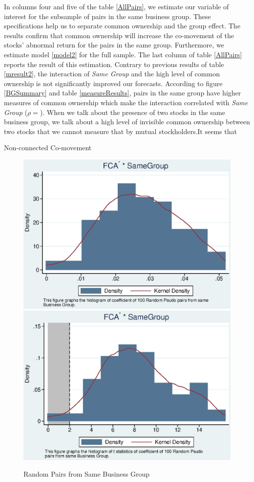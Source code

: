 \documentclass[12pt, a4paper]{article}
\begin{document}
In columns four and five of the table \ref{AllPairs},  we estimate our variable of interest for the subsample of pairs in the same business group. These specifications help us to separate common ownership and the group effect. The results confirm that common ownership will increase the co-movement of the stocks' abnormal return for the pairs in the same group. Furthermore, we estimate model \ref{model2} for the full sample. The last column of table \ref{AllPairs} reports the result of this estimation. Contrary to previous results of table \ref{mresult2}, the interaction of \textit{Same Group} and the high level of common ownership is not significantly improved our forecasts. According to figure \ref{BGSummary} and table \ref{measureResults}, pairs in the same group have higher measures of common ownership which make the interaction correlated with \textit{Same Group} ($ \rho =  $). When we talk about the presence of two stocks in the same business group, we talk about a high level of invisible common ownership between two stocks that we cannot measure that by mutual stockholders.It seems that 

		\begin{table}[htbp]
	\centering
	\caption{Non-connected Co-movement}
%		
\label{AllPairs}
	\resizebox{\textwidth}{!}{
		
	}
\end{table}

\FloatBarrier






		
		\begin{figure}
			\centering
			\caption{Random Pairs from Same Business Group}
			\includegraphics[width=0.45\linewidth]{BusinessPseudoSBFCA.eps}
			\includegraphics[width=0.45\linewidth]{BusinessPseudoSBFCA_t.eps}
		\end{figure}
\end{document}
